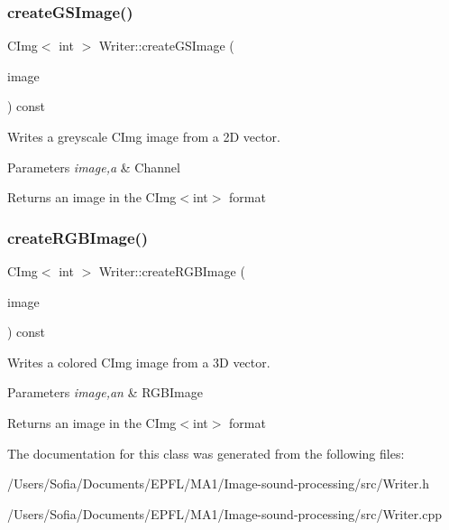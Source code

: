 \subsubsection{\texorpdfstring{create\+G\+S\+Image()}{createGSImage()}}
{\footnotesize\ttfamily C\+Img$<$ int $>$ Writer\+::create\+G\+S\+Image (\begin{DoxyParamCaption}\item[{Channel}]{image }\end{DoxyParamCaption}) const}



Writes a greyscale C\+Img image from a 2D vector. 


\begin{DoxyParams}{Parameters}
{\em image,a} & Channel \\
\hline
\end{DoxyParams}
\begin{DoxyReturn}{Returns}
an image in the C\+Img$<$int$>$ format 
\end{DoxyReturn}
\mbox{\label{class_writer_ad5b28e682415d1e47aa9e5d8e43dc217}} 
\subsubsection{\texorpdfstring{create\+R\+G\+B\+Image()}{createRGBImage()}}
{\footnotesize\ttfamily C\+Img$<$ int $>$ Writer\+::create\+R\+G\+B\+Image (\begin{DoxyParamCaption}\item[{R\+G\+B\+Image}]{image }\end{DoxyParamCaption}) const}



Writes a colored C\+Img image from a 3D vector. 


\begin{DoxyParams}{Parameters}
{\em image,an} & R\+G\+B\+Image \\
\hline
\end{DoxyParams}
\begin{DoxyReturn}{Returns}
an image in the C\+Img$<$int$>$ format 
\end{DoxyReturn}


The documentation for this class was generated from the following files\+:\begin{DoxyCompactItemize}
\item 
/\+Users/\+Sofia/\+Documents/\+E\+P\+F\+L/\+M\+A1/\+Image-\/sound-\/processing/src/Writer.\+h\item 
/\+Users/\+Sofia/\+Documents/\+E\+P\+F\+L/\+M\+A1/\+Image-\/sound-\/processing/src/Writer.\+cpp\end{DoxyCompactItemize}
